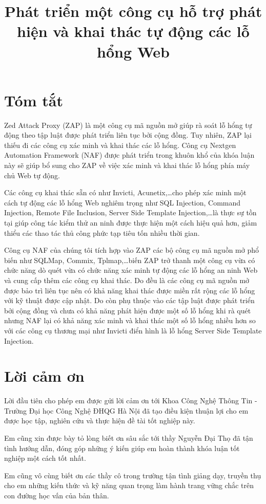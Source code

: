 \documentclass[12pt,a4paper]{report}
\title{Phát triển một công cụ hỗ trợ phát hiện và khai thác tự động các lỗ hổng Web}
\begin{document}

\clearpage{}

\chapter*{Tóm tắt}

Zed Attack Proxy (ZAP) là một công cụ mã nguồn mở giúp rà soát lỗ hổng tự động theo tập luật
được phát triển liên tục bởi cộng đồng. Tuy nhiên, ZAP lại thiếu đi các công cụ xác minh và
khai thác các lỗ hổng. Công cụ Nextgen Automation Framework (NAF) được phát triển trong
khuôn khổ của khóa luận này sẽ giúp bổ sung cho ZAP về việc xác minh và khai thác lỗ hổng
phía máy chủ Web tự động.

Các công cụ khai thác sẵn có như Invicti, Acunetix,\ldots cho phép xác minh một cách tự động các
lỗ hổng Web nghiêm trọng như SQL Injection, Command Injection, Remote File Inclusion,
Server Side Template Injection,\ldots là thực sự tồn tại giúp công tác kiểm thử an ninh được thực
hiện một cách hiệu quả hơn, giảm thiểu các thao tác thủ công phức tạp tiêu tốn nhiều thời gian.

Công cụ NAF của chúng tôi tích hợp vào ZAP các bộ công cụ mã nguồn mở phổ biến như SQLMap,
Commix, Tplmap,\ldots biến ZAP trở thanh một công cụ vừa có chức năng dò quét vừa có chức năng
xác minh tự động các lỗ hổng an ninh Web và cung cấp thêm các công cụ khai thác. Do đều là các
công cụ mã nguồn mở được bảo trì liên tục nên có khả năng khai thác được miền rất rộng các
lỗ hổng với kỹ thuật được cập nhật. Do còn phụ thuộc vào các tập luật được phát triển bởi cộng
đồng và chưa có khả năng phát hiện được một số lỗ hổng khi rà quét nhưng NAF lại có khả năng xác
minh và khai thác một số lỗ hổng nhiều hơn so với các công cụ thương mại như Invicti điển hình
là lỗ hổng Server Side Template Injection.

\chapter*{Lời cảm ơn}

Lời đầu tiên cho phép em được gửi lời cảm ơn tới Khoa Công Nghệ Thông Tin - Trường Đại học Công
Nghệ ĐHQG Hà Nội đã tạo điều kiện thuận lợi cho em được học tập, nghiên cứu và thực hiện
đề tài tốt nghiệp này.

Em cũng xin được bày tỏ lòng biết ơn sâu sắc tới thầy Nguyễn Đại Thọ đã tận tình hướng dẫn,
đóng góp những ý kiến giúp em hoàn thành khóa luận tốt nghiệp một cách tốt nhất.

Em cũng vô cùng biết ơn các thầy cô trong trường tận tình giảng dạy, truyền thụ cho
em những kiến thức và kỹ năng quan trọng làm hành trang vững chắc trên con đường học vấn
của bản thân.
\end{document}
